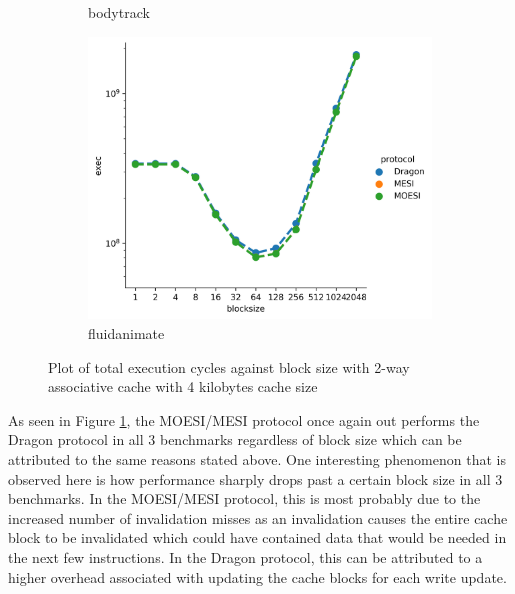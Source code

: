 \documentclass[nonacm,acmsmall,screen,11pt]{acmart}
\begin{document}
\begin{figure}[htb!]
\begin{subfigure}{0.32\textwidth}
    \caption{bodytrack}
  \end{subfigure}
  \begin{subfigure}{0.32\textwidth}
    \includegraphics[width=\columnwidth]{blocksize-fluidanimate}
    \caption{fluidanimate}
  \end{subfigure}
  \caption{Plot of total execution cycles against block size with 2-way associative cache with 4 kilobytes cache size}
  \label{fig:blocksize}
\end{figure}
As seen in Figure \ref{fig:blocksize}, the MOESI/MESI protocol once again out performs the Dragon protocol in all 3 benchmarks regardless of block size which can be attributed to the same reasons stated above. One interesting phenomenon that is observed here is how performance sharply drops past a certain block size in all 3 benchmarks. In the MOESI/MESI protocol, this is most probably due to the increased number of invalidation misses as an invalidation causes the entire cache block to be invalidated which could have contained data that would be needed in the next few instructions. In the Dragon protocol, this can be attributed to a higher overhead associated with updating the cache blocks for each write update.
\end{document}
